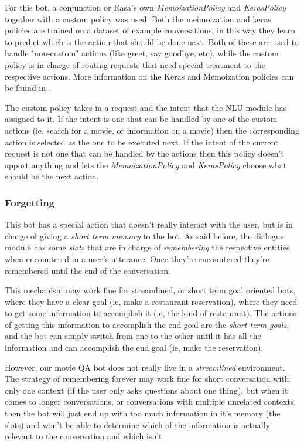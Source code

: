 \documentclass[11pt,a4paper]{article}
\begin{document}
			For this bot, a conjunction or Rasa's own \textit{MemoizationPolicy} and \textit{KerasPolicy} together with a custom policy was used. Both the meimoization and keras policies are trained on a dataset of example conversations, in this way they learn to predict which is the action that should be done next. Both of these are used to handle "non-custom" actions (like greet, say goodbye, etc), while the custom policy is in charge of routing requests that need special treatment to the respective actions. More information on the Keras and Memoization policies can be found in \cite{rasacore}.
			
			The custom policy takes in a request and the intent that the NLU module has assigned to it. If the intent is one that can be handled by one of the custom actions (ie, search for a movie, or information on a movie) then the corresponding action is selected as the one to be executed next. If the intent of the current request is not one that can be handled by the actions then this policy doesn't apport anything and lets the \textit{MemoizationPolicy} and \textit{KerasPolicy} choose what should be the next action.
		
		
		\subsubsection{Forgetting}
		\label{ssec-forgetting}	
		
			This bot has a special action that doesn't really interact with the user, but is in charge of giving a \textit{short term memory} to the bot. As said before, the dialogue module has some \textit{slots} that are in charge of \textit{remembering} the respective entities when encountered in a user's utterance. Once they're encountered they're remembered until the end of the conversation. 
			
			This mechanism may work fine for streamlined, or short term goal oriented bots, where they have a clear goal (ie, make a restaurant reservation), where they need to get some information  to accomplish it (ie, the kind of restaurant). The actions of getting this information to accomplish the end goal are the \textit{short term goals}, and the bot can simply switch from one to the other until it has all the information and can accomplish the end goal (ie, make the reservation). 
			
			However, our movie QA bot does not really live in a \textit{streamlined} environment. The strategy of remembering forever may work fine for short conversation with only one context (if the user only asks questions about one thing), but when it comes to longer conversations, or conversations with multiple unrelated contexts, then the bot will just end up with too much information in it's memory (the slots) and won't be able to determine which of the information is actually relevant to the conversation and which isn't.
			
\end{document}
